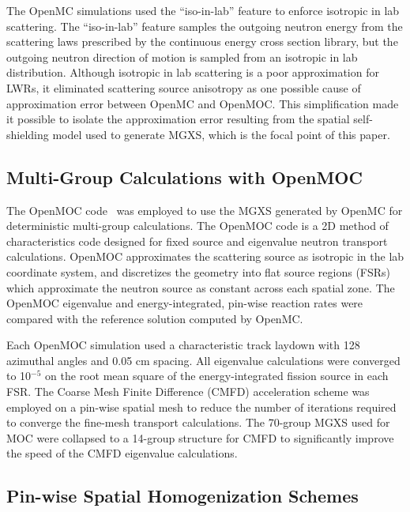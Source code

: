 The OpenMC simulations used the ``iso-in-lab'' feature to enforce isotropic in lab scattering. The ``iso-in-lab'' feature samples the outgoing neutron energy from the scattering laws prescribed by the continuous energy cross section library, but the outgoing neutron direction of motion is sampled from an isotropic in lab distribution. Although isotropic in lab scattering is a poor approximation for LWRs, it eliminated scattering source anisotropy as one possible cause of approximation error between OpenMC and OpenMOC. This simplification made it possible to isolate the approximation error resulting from the spatial self-shielding model used to generate MGXS, which is the focal point of this paper.

\subsection{Multi-Group Calculations with OpenMOC}
\label{subsec:openmoc}

The OpenMOC code~\citep{boyd2014openmoc} was employed to use the MGXS generated by OpenMC for deterministic multi-group calculations. The OpenMOC code is a 2D method of characteristics code designed for fixed source and eigenvalue neutron transport calculations. OpenMOC approximates the scattering source as isotropic in the lab coordinate system, and discretizes the geometry into flat source regions (FSRs) which approximate the neutron source as constant across each spatial zone. The OpenMOC eigenvalue and energy-integrated, pin-wise reaction rates were compared with the reference solution computed by OpenMC.

Each OpenMOC simulation used a characteristic track laydown with 128 azimuthal angles and 0.05 cm spacing. All eigenvalue calculations were converged to 10$^{-5}$ on the root mean square of the energy-integrated fission source in each FSR. The Coarse Mesh Finite Difference (CMFD) acceleration scheme was employed on a pin-wise spatial mesh to reduce the number of iterations required to converge the fine-mesh transport calculations. The 70-group MGXS used for MOC were collapsed to a 14-group structure for CMFD to significantly improve the speed of the CMFD eigenvalue calculations.

\subsection{Pin-wise Spatial Homogenization Schemes}
\label{subsec:homogenize}

